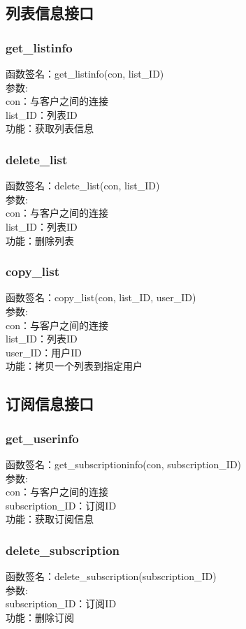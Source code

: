 \subsection{列表信息接口}

\subsubsection{get\_listinfo}
\noindent
函数签名：get\_listinfo(con, list\_ID)\\
参数:\\
con：与客户之间的连接\\
list\_ID：列表ID\\
功能：获取列表信息

\subsubsection{delete\_list}
\noindent
函数签名：delete\_list(con, list\_ID)\\
参数:\\
con：与客户之间的连接\\
list\_ID：列表ID\\
功能：删除列表

\subsubsection{copy\_list}
\noindent
函数签名：copy\_list(con, list\_ID, user\_ID)\\
参数:\\
con：与客户之间的连接\\
list\_ID：列表ID\\
user\_ID：用户ID\\
功能：拷贝一个列表到指定用户

\subsection{订阅信息接口}

\subsubsection{get\_userinfo}
\noindent
函数签名：get\_subscriptioninfo(con, subscription\_ID)\\
参数:\\
con：与客户之间的连接\\
subscription\_ID：订阅ID\\
功能：获取订阅信息

\subsubsection{delete\_subscription}
\noindent
函数签名：delete\_subscription(subscription\_ID)\\
参数:\\
subscription\_ID：订阅ID\\
功能：删除订阅

